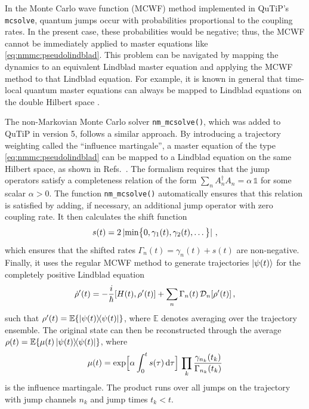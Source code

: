 \documentclass[preprint,3p,sort&compress]{elsarticle}
\def\code#1{\texttt{#1}}
\begin{document}
In the Monte Carlo wave function (MCWF) method implemented in QuTiP's \code{mcsolve}, quantum jumps occur with probabilities proportional to the coupling rates.
In the present case, these probabilities would be negative; thus, the MCWF cannot be immediately applied to master equations like \eqref{eq:nmmc:pseudolindblad}.
This problem can be navigated by mapping the dynamics to an equivalent Lindblad master equation and applying the MCWF method to that Lindblad equation.
For example, it is known in general that time-local quantum master equations can always be mapped to Lindblad equations on the double Hilbert space \cite{BreuerPhysRevA1999, HushPhysRevA2015, MenczelArXiv240111830Quant-Ph2024}.

The non-Markovian Monte Carlo solver \code{nm\_mcsolve()}, which was added to QuTiP in version 5, follows a similar approach.
By introducing a trajectory weighting called the ``influence martingale'', a master equation of the type \eqref{eq:nmmc:pseudolindblad} can be mapped to a Lindblad equation on the same Hilbert space, as shown in Refs.~\cite{DonvilNatCommun2022, DonvilNewJPhys2023, DonvilOpenSystInfDyn2023}. 
The formalism requires that the jump operators satisfy a completeness relation of the form $\sum_n A_n^\dagger A_n = \alpha\, \mathbb 1$ for some scalar $\alpha > 0$.
The function \code{nm\_mcsolve()} automatically ensures that this relation is satisfied by adding, if necessary, an additional jump operator with zero coupling rate.
It then calculates the shift function
\begin{equation}
    s(t) = 2\, \abs*{ \min\bigl\{ 0, \gamma_1(t), \gamma_2(t), \dots \bigr\} }\, ,
\end{equation}
which ensures that the shifted rates $\Gamma_n(t) = \gamma_n(t) + s(t)$ are non-negative.
Finally, it uses the regular MCWF method to generate trajectories $\ket{\psi(t)}$ for the completely positive Lindblad equation
\begin{equation}
    \dot \rho'(t) = -\frac{i}{\hbar} \comm{H(t)}{\rho'(t)} + \sum_n \Gamma_n(t)\, \mathcal D_n[\rho'(t)] \, ,
\end{equation}
such that $\rho'(t) = \mathbb E\{ \ketbra{\psi(t)} \}$, where $\mathbb E$ denotes averaging over the trajectory ensemble.
The original state can then be reconstructed through the average $\rho(t) = \mathbb E\{ \mu(t) \ketbra{\psi(t)} \}$, where
\begin{equation} \label{eq:influence_martingale}
    \mu(t) = \exp\Bigl[ \alpha \int_0^t s(\tau)\, \dd\tau \Bigr]\, \prod_k \frac{\gamma_{n_k}(t_k)}{\Gamma_{n_k}(t_k)}
\end{equation}
is the influence martingale.
The product runs over all jumps on the trajectory with jump channels $n_k$ and jump times $t_k < t$.
\end{document}
